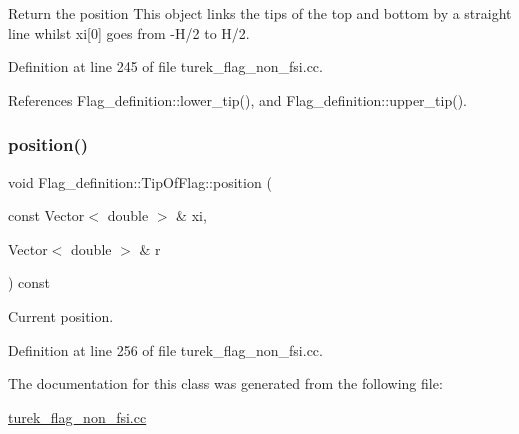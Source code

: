 Return the position This object links the tips of the top and bottom by a straight line whilst xi\mbox{[}0\mbox{]} goes from -\/\+H/2 to H/2. 



Definition at line 245 of file turek\+\_\+flag\+\_\+non\+\_\+fsi.\+cc.



References Flag\+\_\+definition\+::lower\+\_\+tip(), and Flag\+\_\+definition\+::upper\+\_\+tip().

\mbox{\label{classFlag__definition_1_1TipOfFlag_ae4e08c72baeaca1fe62bca6f36262fa7}} 
\subsubsection{\texorpdfstring{position()}{position()}\hspace{0.1cm}{\footnotesize\ttfamily [2/2]}}
{\footnotesize\ttfamily void Flag\+\_\+definition\+::\+Tip\+Of\+Flag\+::position (\begin{DoxyParamCaption}\item[{const Vector$<$ double $>$ \&}]{xi,  }\item[{Vector$<$ double $>$ \&}]{r }\end{DoxyParamCaption}) const\hspace{0.3cm}{\ttfamily [inline]}}



Current position. 



Definition at line 256 of file turek\+\_\+flag\+\_\+non\+\_\+fsi.\+cc.



The documentation for this class was generated from the following file\+:\begin{DoxyCompactItemize}
\item 
\hyperlink{turek__flag__non__fsi_8cc}{turek\+\_\+flag\+\_\+non\+\_\+fsi.\+cc}\end{DoxyCompactItemize}
